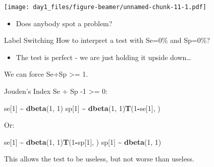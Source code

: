 \documentclass[
  ignorenonframetext,
]{beamer}
\newenvironment{Shaded}{\begin{snugshade}}{\end{snugshade}}
\newcommand{\DecValTok}[1]{\textcolor[rgb]{0.00,0.00,0.81}{#1}}
\newcommand{\FunctionTok}[1]{\textcolor[rgb]{0.13,0.29,0.53}{\textbf{#1}}}
\newcommand{\NormalTok}[1]{#1}
\newcommand{\SpecialCharTok}[1]{\textcolor[rgb]{0.81,0.36,0.00}{\textbf{#1}}}
\providecommand{\tightlist}{%
  \setlength{\itemsep}{0pt}\setlength{\parskip}{0pt}}
\begin{document}
\begin{frame}
\scriptsize\texttt{[image: day1\_files/figure-beamer/unnamed-chunk-11-1.pdf]}
\normalsize
\end{frame}

\begin{frame}
\begin{itemize}
\tightlist
\item
  Does anybody spot a problem?
\end{itemize}
\end{frame}

\begin{frame}[fragile]
\begin{block}{Label Switching}
\protect\hypertarget{label-switching}{}
How to interpret a test with Se=0\% and Sp=0\%?

\begin{itemize}
\tightlist
\item
  The test is perfect - we are just holding it upside down\ldots{}
\end{itemize}

We can force Se+Sp \textgreater= 1.

Jouden's Index Se + Sp -1 \textgreater= 0:

\scriptsize

\begin{Shaded}
\begin{Highlighting}[]
\NormalTok{  se[}\DecValTok{1}\NormalTok{] }\SpecialCharTok{\textasciitilde{}} \FunctionTok{dbeta}\NormalTok{(}\DecValTok{1}\NormalTok{, }\DecValTok{1}\NormalTok{)}
\NormalTok{  sp[}\DecValTok{1}\NormalTok{] }\SpecialCharTok{\textasciitilde{}} \FunctionTok{dbeta}\NormalTok{(}\DecValTok{1}\NormalTok{, }\DecValTok{1}\NormalTok{)}\FunctionTok{T}\NormalTok{(}\DecValTok{1}\SpecialCharTok{{-}}\NormalTok{se[}\DecValTok{1}\NormalTok{], )}
\end{Highlighting}
\end{Shaded}

\normalsize

Or:

\scriptsize

\begin{Shaded}
\begin{Highlighting}[]
\NormalTok{  se[}\DecValTok{1}\NormalTok{] }\SpecialCharTok{\textasciitilde{}} \FunctionTok{dbeta}\NormalTok{(}\DecValTok{1}\NormalTok{, }\DecValTok{1}\NormalTok{)}\FunctionTok{T}\NormalTok{(}\DecValTok{1}\SpecialCharTok{{-}}\NormalTok{sp[}\DecValTok{1}\NormalTok{], )}
\NormalTok{  sp[}\DecValTok{1}\NormalTok{] }\SpecialCharTok{\textasciitilde{}} \FunctionTok{dbeta}\NormalTok{(}\DecValTok{1}\NormalTok{, }\DecValTok{1}\NormalTok{)}
\end{Highlighting}
\end{Shaded}

\normalsize

This allows the test to be useless, but not worse than useless.
\end{block}
\end{frame}
\end{document}
